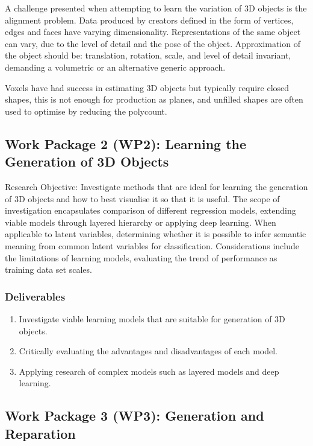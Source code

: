 \documentclass[a4paper, fontsize=15pt, onecolumn]{article} %
\numberwithin{equation}{section} %
\numberwithin{figure}{section} %
\numberwithin{table}{section} %
\begin{document}
A challenge presented when attempting to learn the variation of 3D objects is the alignment problem. Data produced by creators defined in the form of vertices, edges and faces have varying dimensionality. Representations of the same object can vary, due to the level of detail and the pose of the object. Approximation of the object should be: translation, rotation, scale, and level of detail invariant, demanding a volumetric or an alternative generic approach.

Voxels have had success in estimating 3D objects but typically require closed shapes, this is not enough for production as planes, and unfilled shapes are often used to optimise by reducing the polycount.

\subsection{Work Package 2 (WP2): Learning the Generation of 3D Objects}

Research Objective: Investigate methods that are ideal for learning the generation of 3D objects and how to best visualise it so that it is useful. The scope of investigation encapsulates comparison of different regression models, extending viable models through layered hierarchy or applying deep learning. When applicable to latent variables, determining whether it is possible to infer semantic meaning from common latent variables for classification. Considerations include the limitations of learning models, evaluating the trend of performance as training data set scales.

\subsubsection{Deliverables} 
\begin{enumerate}
	\item Investigate viable learning models that are suitable for generation of 3D objects.
	\item Critically evaluating the advantages and disadvantages of each model.
	\item Applying research of complex models such as layered models and deep learning.
\end{enumerate}

\subsection{Work Package 3 (WP3): Generation and Reparation}
\end{document}
